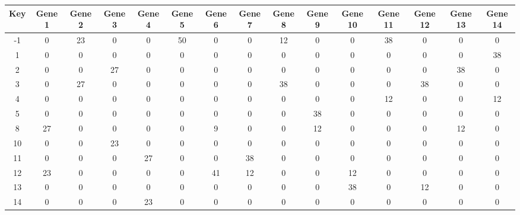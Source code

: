 \begin{tabular}{|c|c|c|c|c|c|c|c|c|c|c|c|c|c|c|}
\hline
Key & Gene 1 & Gene 2 & Gene 3 & Gene 4 & Gene 5 & Gene 6 & Gene 7 & Gene 8 & Gene 9 & Gene 10 & Gene 11 & Gene 12 & Gene 13 & Gene 14 \\
\hline
-1 & 0 & 23 & 0 & 0 & 50 & 0 & 0 & 12 & 0 & 0 & 38 & 0 & 0 & 0 \\
1 & 0 & 0 & 0 & 0 & 0 & 0 & 0 & 0 & 0 & 0 & 0 & 0 & 0 & 38 \\
2 & 0 & 0 & 27 & 0 & 0 & 0 & 0 & 0 & 0 & 0 & 0 & 0 & 38 & 0 \\
3 & 0 & 27 & 0 & 0 & 0 & 0 & 0 & 38 & 0 & 0 & 0 & 38 & 0 & 0 \\
4 & 0 & 0 & 0 & 0 & 0 & 0 & 0 & 0 & 0 & 0 & 12 & 0 & 0 & 12 \\
5 & 0 & 0 & 0 & 0 & 0 & 0 & 0 & 0 & 38 & 0 & 0 & 0 & 0 & 0 \\
8 & 27 & 0 & 0 & 0 & 0 & 9 & 0 & 0 & 12 & 0 & 0 & 0 & 12 & 0 \\
10 & 0 & 0 & 23 & 0 & 0 & 0 & 0 & 0 & 0 & 0 & 0 & 0 & 0 & 0 \\
11 & 0 & 0 & 0 & 27 & 0 & 0 & 38 & 0 & 0 & 0 & 0 & 0 & 0 & 0 \\
12 & 23 & 0 & 0 & 0 & 0 & 41 & 12 & 0 & 0 & 12 & 0 & 0 & 0 & 0 \\
13 & 0 & 0 & 0 & 0 & 0 & 0 & 0 & 0 & 0 & 38 & 0 & 12 & 0 & 0 \\
14 & 0 & 0 & 0 & 23 & 0 & 0 & 0 & 0 & 0 & 0 & 0 & 0 & 0 & 0 \\
\hline
\end{tabular}
